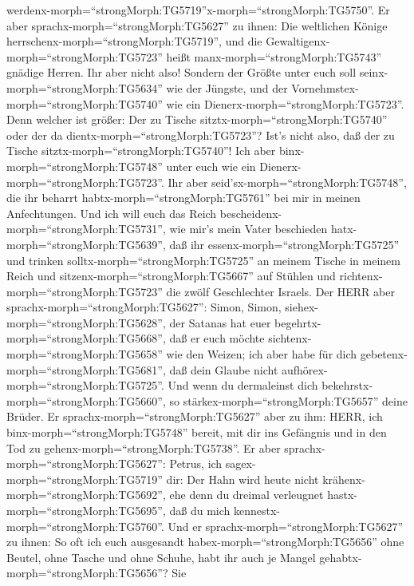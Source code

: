 werdenx-morph=``strongMorph:TG5719''x-morph=``strongMorph:TG5750''.
 Er aber sprachx-morph=``strongMorph:TG5627'' zu ihnen: Die
weltlichen Könige herrschenx-morph=``strongMorph:TG5719'', und die
Gewaltigenx-morph=``strongMorph:TG5723'' heißt
manx-morph=``strongMorph:TG5743'' gnädige Herren.  Ihr aber
nicht also! Sondern der Größte unter euch soll
seinx-morph=``strongMorph:TG5634'' wie der Jüngste, und der
Vornehmstex-morph=``strongMorph:TG5740'' wie ein
Dienerx-morph=``strongMorph:TG5723''.  Denn welcher ist
größer: Der zu Tische sitztx-morph=``strongMorph:TG5740'' oder der da
dientx-morph=``strongMorph:TG5723''? Ist's nicht also, daß der zu Tische
sitztx-morph=``strongMorph:TG5740''! Ich aber
binx-morph=``strongMorph:TG5748'' unter euch wie ein
Dienerx-morph=``strongMorph:TG5723''.  Ihr aber
seid'sx-morph=``strongMorph:TG5748'', die ihr beharrt
habtx-morph=``strongMorph:TG5761'' bei mir in meinen Anfechtungen.
 Und ich will euch das Reich
bescheidenx-morph=``strongMorph:TG5731'', wie mir's mein Vater
beschieden hatx-morph=``strongMorph:TG5639'',  daß ihr
essenx-morph=``strongMorph:TG5725'' und trinken
solltx-morph=``strongMorph:TG5725'' an meinem Tische in meinem Reich und
sitzenx-morph=``strongMorph:TG5667'' auf Stühlen und
richtenx-morph=``strongMorph:TG5723'' die zwölf Geschlechter Israels.
 Der HERR aber sprachx-morph=``strongMorph:TG5627'': Simon,
Simon, siehex-morph=``strongMorph:TG5628'', der Satanas hat euer
begehrtx-morph=``strongMorph:TG5668'', daß er euch möchte
sichtenx-morph=``strongMorph:TG5658'' wie den Weizen;  ich
aber habe für dich gebetenx-morph=``strongMorph:TG5681'', daß dein
Glaube nicht aufhörex-morph=``strongMorph:TG5725''. Und wenn du
dermaleinst dich bekehrstx-morph=``strongMorph:TG5660'', so
stärkex-morph=``strongMorph:TG5657'' deine Brüder.  Er
sprachx-morph=``strongMorph:TG5627'' aber zu ihm: HERR, ich
binx-morph=``strongMorph:TG5748'' bereit, mit dir ins Gefängnis und in
den Tod zu gehenx-morph=``strongMorph:TG5738''.  Er aber
sprachx-morph=``strongMorph:TG5627'': Petrus, ich
sagex-morph=``strongMorph:TG5719'' dir: Der Hahn wird heute nicht
krähenx-morph=``strongMorph:TG5692'', ehe denn du dreimal verleugnet
hastx-morph=``strongMorph:TG5695'', daß du mich
kennestx-morph=``strongMorph:TG5760''.  Und er
sprachx-morph=``strongMorph:TG5627'' zu ihnen: So oft ich euch
ausgesandt habex-morph=``strongMorph:TG5656'' ohne Beutel, ohne Tasche
und ohne Schuhe, habt ihr auch je Mangel
gehabtx-morph=``strongMorph:TG5656''? Sie
